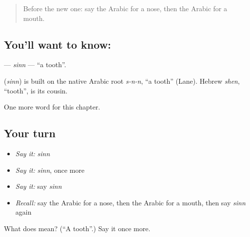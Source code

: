 \label{lesson:AR-C50-sinn}



\begin{quote}
Before the new one: say the Arabic for a nose, then the Arabic for a mouth.
\end{quote}

\subsection*{You'll want to know: }
\textbf{} — \emph{sinn} — \textquotedblleft{}a tooth\textquotedblright{}.

\begin{cousinweb}
\textbf{} (\emph{sinn}) is built on the native Arabic root \emph{s-n-n}, \textquotedblleft{}a tooth\textquotedblright{} (Lane). Hebrew \emph{shen}, \textquotedblleft{}tooth\textquotedblright{}, is its cousin.
\end{cousinweb}

\begin{grammarlens}[title={What you've built}]
One more word for this chapter.
\end{grammarlens}

\subsection*{Your turn}
\begin{itemize}
\raggedright
  \item \emph{Say it:} \emph{sinn}
  \item \emph{Say it:} \emph{sinn}, once more
  \item \emph{Say it:} say \emph{sinn}
  \item \emph{Recall:} say the Arabic for a nose, then the Arabic for a mouth, then say \emph{sinn} again
\end{itemize}

\begin{tcolorbox}[breakable,colback=teal!4,colframe=teal!35!black,title={Before you move on}]
What does  mean? (\textquotedblleft{}A tooth\textquotedblright{}.) Say it once more.
\end{tcolorbox}
